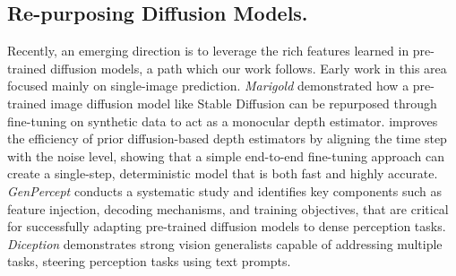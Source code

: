 \documentclass[11pt, a4paper, logo, onecolumn]{googledeepmind}
\begin{document}
\subsection{Re-purposing Diffusion Models.}
Recently, an emerging direction is to leverage the rich features learned in pre-trained diffusion models, a path which our work follows. 
Early work in this area focused mainly on single-image prediction.
\textit{Marigold} \cite{Ke_2024_CVPR} demonstrated how a pre-trained image diffusion
model like Stable Diffusion \cite{rombach2022high} can be repurposed through fine-tuning on
synthetic data to act as a %
monocular depth estimator.
\cite{martingarcia2024diffusione2eft} improves the efficiency of prior diffusion-based depth
estimators \cite{Ke_2024_CVPR,fu2024geowizard} by aligning the time step with the noise level,
showing that a simple end-to-end fine-tuning approach can create a single-step, deterministic model
that is both fast and highly accurate. \textit{GenPercept} \cite{xu2024diffusion} conducts a systematic study and
identifies key components such as feature injection, decoding mechanisms, and training objectives,
that are critical for successfully adapting pre-trained diffusion models to dense perception tasks. 
\textit{Diception} \cite{zhao2025diception} demonstrates strong vision generalists capable of addressing multiple tasks, steering perception tasks using text prompts.
\end{document}
